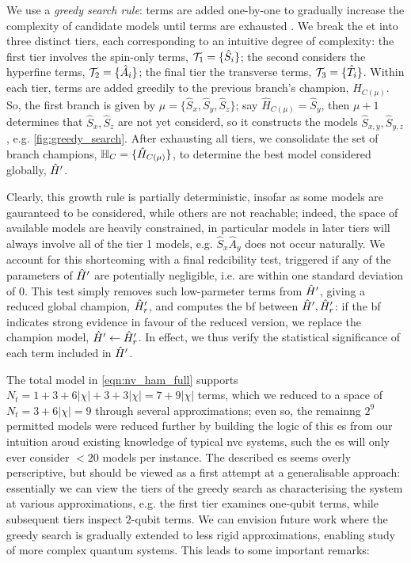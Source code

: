 We use a \emph{greedy search rule}: 
    terms are added one-by-one to gradually increase the complexity of candidate models until terms are exhausted \cite{russell2002artificial}.  
We break the \gls{et} into three distinct tiers, each corresponding to an intuitive degree of complexity:
    the first tier involves the spin-only terms, $\mathcal{T}_1 = \{ \hat{S}_i \}$; 
    the second considers the hyperfine terms, $\mathcal{T}_2 = \{ \hat{A}_i \}$;
    the final tier the transverse terms, $\mathcal{T}_3 = \{ \hat{T}_i\}$.  
Within each tier, terms are added greedily to the previous branch's champion, $\hat{H}_{C(\mu)}$.
So, the first branch is given by $\mu = \{ \hat{S}_x, \hat{S}_y, \hat{S}_z\}$;
    say $\hat{H}_{C(\mu)} = \hat{S}_y$, then $\mu + 1$  determines that $\hat{S}_x, \hat{S}_z$ 
    are not yet considerd, so it constructs the models $\hat{S}_{x,y}, \hat{S}_{y,z}$, e.g. \cref{fig:greedy_search}. 
After exhausting all tiers, we consolidate the set of branch champions, $\mathbb{H}_C = \{ \hat{H}_{C(\mu)}\}$, 
    to determine the best model considered globally, $\hat{H}^{\prime}$.  
\par 
Clearly, this growth rule is partially deterministic, insofar as some models are gauranteed to be considered, 
    while others are not reachable; 
    indeed, the space of available models are heavily constrained, in particular models in later tiers will 
    always involve all of the tier 1 models, e.g. $\hat{S}_{x}\hat{A}_{y}$ does not occur naturally. 
We account for this shortcoming with a final redcibility test, 
    triggered if any of the parameters of $\hat{H}^{\prime}$ are potentially negligible, 
    i.e. are within one standard deviation of 0. 
This test simply removes such low-parmeter terms from $\hat{H}^{\prime}$, 
    giving a reduced global champion, $\hat{H}^{\prime}_r$, 
    and computes the \gls{bf} between $\hat{H}^{\prime}, \hat{H}^{\prime}_r$: 
    if the \gls{bf} indicates strong evidence in favour of the reduced version, 
    we replace the \gls{champion model}, $\hat{H}^{\prime} \gets \hat{H}^{\prime}_r$. 
In effect, we thus verify the statistical significance of each term included in $\hat{H}^{\prime}$. 
\par 

The total model in \cref{eqn:nv_ham_full} supports $N_t = 1 + 3 + 6 | \chi | + 3 + 3 |\chi| = 7 + 9|\chi| $ terms, 
    which we reduced to a space of $N_t=3 + 6 |\chi| = 9$ through several approximations\footnotemark ;
    even so, the remainng $2^9$ permitted models were reduced further by building the logic of this \gls{es} 
    from our intuition aroud existing knowledge of typical \gls{nvc} systems,
    such the \gls{es} will only ever consider $<20$ models per instance. 
The described \gls{es} seems overly perscriptive, 
    but should be viewed as a first attempt at a generalisable approach: 
    essentially we can view the tiers of the greedy search as characterising the system 
    at various approximations, 
    e.g. the first tier examines one-qubit terms, while subsequent tiers inspect $2$-qubit terms. 
We can envision future work where the greedy search is gradually extended to less rigid approximations, 
    enabling study of more complex quantum systems.     
This leads to some important remarks:

